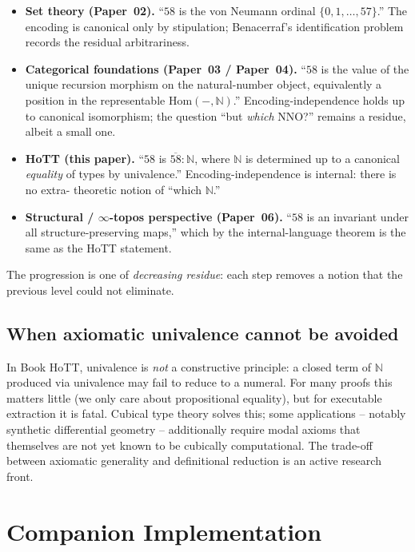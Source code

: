 \documentclass[12pt]{article}
\theoremstyle{definition}
\theoremstyle{remark}
\newcommand{\N}{\mathbb{N}}
\begin{document}
\begin{itemize}
\item \textbf{Set theory (Paper~02).} ``$58$ is the von Neumann ordinal
$\{0, 1, \ldots, 57\}$.'' The encoding is canonical only by stipulation;
Benacerraf's identification problem records the residual arbitrariness.

\item \textbf{Categorical foundations (Paper~03 / Paper~04).}
``$58$ is the value of the unique recursion morphism on the natural-number
object, equivalently a position in the representable
$\mathrm{Hom}(-, \N)$.'' Encoding-independence holds up to canonical
isomorphism; the question ``but \emph{which} NNO?'' remains a residue,
albeit a small one.

\item \textbf{HoTT (this paper).} ``$58$ is $\overline{58} : \N$, where
$\N$ is determined up to a canonical \emph{equality} of types by
univalence.'' Encoding-independence is internal: there is no extra-
theoretic notion of ``which $\N$.''

\item \textbf{Structural / $\infty$-topos perspective (Paper~06).} ``$58$
is an invariant under all structure-preserving maps,'' which by the
internal-language theorem is the same as the HoTT statement.
\end{itemize}

The progression is one of \emph{decreasing residue}: each step removes a
notion that the previous level could not eliminate.

\subsection{When axiomatic univalence cannot be avoided}

In Book HoTT, univalence is \emph{not} a constructive principle: a closed
term of $\N$ produced via univalence may fail to reduce to a numeral. For
many proofs this matters little (we only care about propositional
equality), but for executable extraction it is fatal. Cubical type theory
solves this; some applications -- notably synthetic differential geometry
\cite{SchreiberShulman} -- additionally require modal axioms that
themselves are not yet known to be cubically computational. The trade-off
between axiomatic generality and definitional reduction is an active
research front.

\section{Companion Implementation}
\label{sec:haskell}
\end{document}
